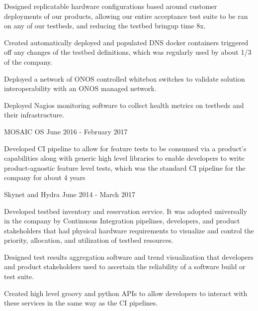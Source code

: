 \begin{cventries}
{\begin{cvitems}
        \item {Designed replicatable hardware configurations based around customer deployments of our products, allowing our entire acceptance test suite to be ran on any of our testbeds, and reducing the testbed bringup time 8x.}
        \item {Created automatically deployed and populated DNS docker containers triggered off any changes of the testbed definitions, which was regularly used by about 1/3 of the company.}
        \item {Deployed a network of ONOS controlled whitebox switches to validate solution interoperability with an ONOS managed network.}
        \item {Deployed Nagios monitoring software to collect health metrics on testbeds and their infrastructure.}
      \end{cvitems}
    }

  \cventry
    {} {MOSAIC OS} {} {June 2016 - February 2017} {
      \begin{cvitems}
        \item {Developed CI pipeline to allow for feature tests to be consumed via a product's capabilities along with generic high level libraries to enable developers to write product-agnostic feature level tests, which was the standard CI pipeline for the company for about 4 years}
      \end{cvitems}
    }

  \cventry
    {} {Skynet and Hydra} {} {June 2014 - March 2017} {
      \begin{cvitems} %
        \item {Developed testbed inventory and reservation service. It was adopted universally in the company by Continuous Integration pipelines, developers, and product stakeholders that had physical hardware requirements to visualize and control the priority, allocation, and utilization of testbed resources.}
        \item {Designed test results aggregation software and trend visualization that developers and product stakeholders used to ascertain the reliability of a software build or test suite.}
        \item {Created high level groovy and python APIs to allow developers to interact with these services in the same way as the CI pipelines.}
      \end{cvitems}
    }

\end{cventries}
